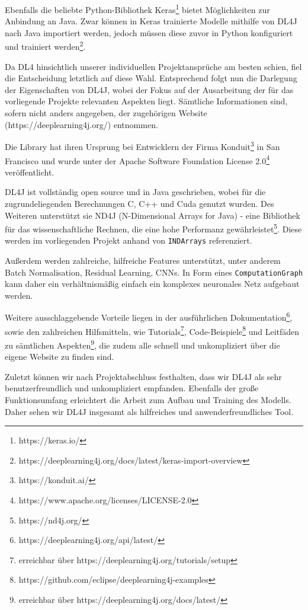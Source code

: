 \documentclass[12pt,a4paper]{article}
\begin{document}
Ebenfalls die beliebte Python-Bibliothek Keras\footnote{https://keras.io/} bietet Möglichkeiten zur Anbindung an Java. Zwar können in Keras trainierte Modelle mithilfe von DL4J nach Java importiert werden, jedoch müssen diese zuvor in Python konfiguriert und trainiert werden\footnote{https://deeplearning4j.org/docs/latest/keras-import-overview}.

Da DL4 hinsichtlich unserer individuellen Projektansprüche am besten schien, fiel die Entscheidung letztlich auf diese Wahl. Entsprechend folgt nun die Darlegung der Eigenschaften von DL4J, wobei der Fokus auf der Ausarbeitung der für das vorliegende Projekte relevanten Aspekten liegt. Sämtliche Informationen sind, sofern nicht anders angegeben, der zugehörigen Website (https://deeplearning4j.org/) entnommen.

Die Library hat ihren Ursprung bei Entwicklern der Firma Konduit\footnote{https://konduit.ai/} in San Francisco und wurde unter der Apache Software Foundation License 2.0\footnote{https://www.apache.org/licenses/LICENSE-2.0} veröffentlicht.

DL4J ist vollständig open source und in Java geschrieben, wobei für die zugrundeliegenden Berechnungen C, C++ und Cuda genutzt wurden. Des Weiteren unterstützt sie ND4J (N-Dimensional Arrays for Java) - eine Bibliothek für das wissenschaftliche Rechnen, die eine hohe Performanz gewährleistet\footnote{https://nd4j.org/}. Diese werden im vorliegenden Projekt anhand von \texttt{INDArrays} referenziert.

Außerdem werden zahlreiche, hilfreiche Features unterstützt, unter anderem Batch Normalisation, Residual Learning, CNNs. In Form eines \texttt{ComputationGraph} kann daher ein verhältnismäßig einfach ein komplexes neuronales Netz aufgebaut werden.

Weitere ausschlaggebende Vorteile liegen in der ausführlichen Dokumentation\footnote{https://deeplearning4j.org/api/latest/}, sowie den zahlreichen Hilfsmitteln, wie Tutorials\footnote{erreichbar über https://deeplearning4j.org/tutorials/setup}, Code-Beispiele\footnote{https://github.com/eclipse/deeplearning4j-examples} und Leitfäden zu sämtlichen Aspekten\footnote{erreichbar über https://deeplearning4j.org/docs/latest/}, die zudem alle schnell und unkompliziert über die eigene Website zu finden sind.

Zuletzt können wir nach Projektabschluss festhalten, dass wir DL4J als sehr benutzerfreundlich und unkompliziert empfanden. Ebenfalls der große Funktionsumfang erleichtert die Arbeit zum Aufbau und Training des Modells. Daher sehen wir DL4J insgesamt als hilfreiches und anwenderfreundliches Tool.
\end{document}

